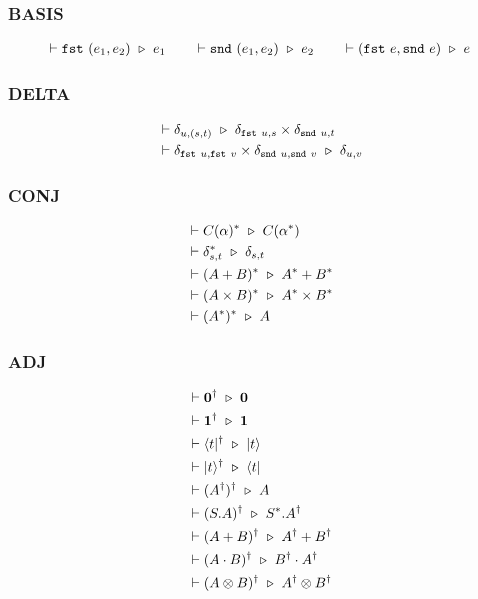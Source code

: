 

\subsubsection*{\textsf{BASIS}}
\begin{align*}
    \vdash \texttt{fst}\ (e_1, e_2) \ \triangleright\  e_1
    \qquad
    \vdash \texttt{snd}\ (e_1, e_2) \ \triangleright\  e_2
    \qquad
    \vdash (\texttt{fst}\ e, \texttt{snd}\ e)\ \triangleright\  e
\end{align*}

\subsubsection*{\textsf{DELTA}}
\begin{align*}
  & \vdash \delta_{u, (s, t)} \ \triangleright\  \delta_{\texttt{fst}\ u, s} \times \delta_{\texttt{snd}\ u, t} \\
  & \vdash \delta_{\texttt{fst}\ u, \texttt{fst}\ v}\times\delta_{\texttt{snd}\ u, \texttt{snd}\ v} \ \triangleright\  \delta_{u, v}
\end{align*}

\subsubsection*{\textsf{CONJ}}
\begin{align*}
  & \vdash C(\alpha)^* \ \triangleright\  C(\alpha^*) \\
  & \vdash \delta_{s, t}^* \ \triangleright\  \delta_{s, t} \\
  & \vdash (A + B)^* \ \triangleright\  A^* + B^* \\
  & \vdash (A \times B)^* \ \triangleright\  A^* \times B^* \\
  & \vdash (A^*)^* \ \triangleright\  A
\end{align*}

\subsubsection*{\textsf{ADJ}}
\begin{align*}
  & \vdash \textbf{0}^\dagger \ \triangleright\  \textbf{0} \\
  & \vdash \mathbf{1}^\dagger \ \triangleright\  \mathbf{1} \\
  & \vdash \langle t|^\dagger \ \triangleright\  |t\rangle\\
  & \vdash |t\rangle^\dagger \ \triangleright\  \langle t|\\
  & \vdash (A^\dagger)^\dagger \ \triangleright\  A \\
  & \vdash (S.A)^\dagger \ \triangleright\  S^* . A^\dagger \\
  & \vdash (A + B)^\dagger \ \triangleright\  A^\dagger + B^\dagger\\
  & \vdash (A \cdot B)^\dagger \ \triangleright\  B^\dagger \cdot A^\dagger \\
  & \vdash (A \otimes B)^\dagger \ \triangleright\  A^\dagger \otimes B^\dagger
\end{align*}


